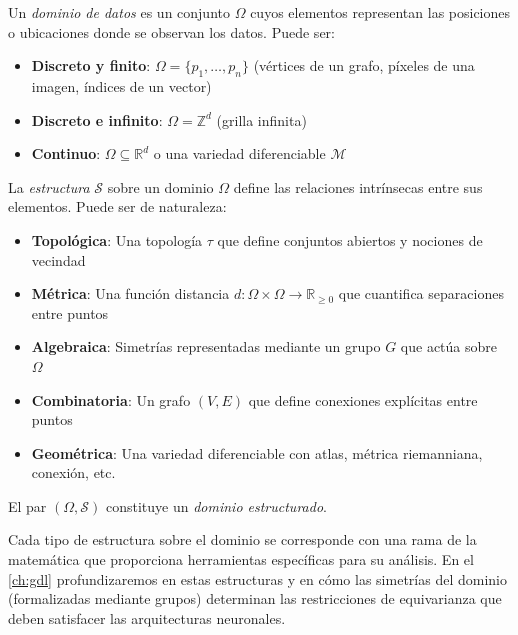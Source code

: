 \begin{definition}\label{def:dominio_datos}
Un \textit{dominio de datos} es un conjunto $\Omega$ cuyos elementos representan las posiciones o ubicaciones donde se observan los datos. Puede ser:
\begin{itemize}
	\item \textbf{Discreto y finito}: $\Omega = \{p_1, \ldots, p_n\}$ (vértices de un grafo, píxeles de una imagen, índices de un vector)
	\item \textbf{Discreto e infinito}: $\Omega = \mathbb{Z}^d$ (grilla infinita)
	\item \textbf{Continuo}: $\Omega \subseteq \mathbb{R}^d$ o una variedad diferenciable $\mathcal{M}$
\end{itemize}
\end{definition}

\begin{definition}\label{def:estructura_dominio}
La \textit{estructura} $\mathcal{S}$ sobre un dominio $\Omega$ define las relaciones intrínsecas entre sus elementos. Puede ser de naturaleza:
\begin{itemize}
	\item \textbf{Topológica}: Una topología $\tau$ que define conjuntos abiertos y nociones de vecindad
	\item \textbf{Métrica}: Una función distancia $d: \Omega \times \Omega \to \mathbb{R}_{\geq 0}$ que cuantifica separaciones entre puntos
	\item \textbf{Algebraica}: Simetrías representadas mediante un grupo $G$ que actúa sobre $\Omega$
	\item \textbf{Combinatoria}: Un grafo $(V, E)$ que define conexiones explícitas entre puntos
	\item \textbf{Geométrica}: Una variedad diferenciable con atlas, métrica riemanniana, conexión, etc.
\end{itemize}

El par $(\Omega, \mathcal{S})$ constituye un \textit{dominio estructurado}.
\end{definition}

Cada tipo de estructura sobre el dominio se corresponde con una rama de la matemática que proporciona herramientas específicas para su análisis. En el \autoref{ch:gdl} profundizaremos en estas estructuras y en cómo las simetrías del dominio (formalizadas mediante grupos) determinan las restricciones de equivarianza que deben satisfacer las arquitecturas neuronales.

